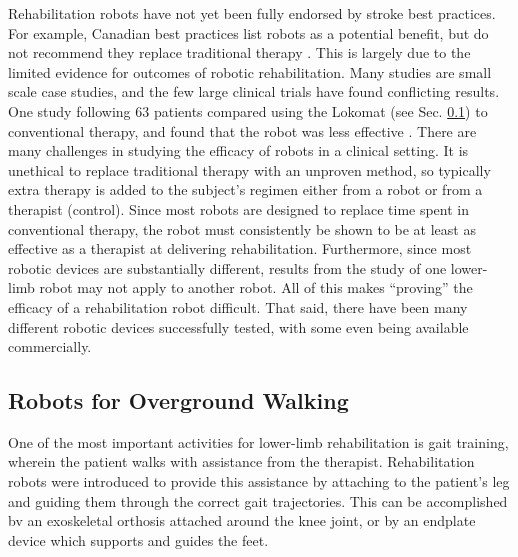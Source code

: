 \documentclass[12pt]{report}
\begin{document}
	
	Rehabilitation robots have not yet been fully endorsed by stroke best practices. For example, Canadian best practices list robots as a potential benefit, but do not recommend they replace traditional therapy \cite{Hebert2016}. This is largely due to the limited evidence for outcomes of robotic rehabilitation. Many studies are small scale case studies, and the 
few large clinical trials have found conflicting results. One study following 63 patients compared using the Lokomat (see Sec. \ref{Sec:Overground}) to conventional therapy, and found that the robot was less effective \cite{Hidler2008}. There are many challenges in studying the efficacy of robots in a clinical setting. It is unethical to replace traditional therapy with an unproven method, so typically extra therapy is added to the subject's regimen either from a robot or from a therapist (control). Since most robots are designed to replace time spent in conventional therapy, the robot must consistently be shown to be at least as effective as a therapist at delivering rehabilitation. Furthermore, since most robotic devices are substantially different, results from the study of one lower-limb robot may not apply to another robot. All of this makes ``proving'' the efficacy of a rehabilitation robot difficult. That said, there have been many different robotic devices successfully tested, with some even being available commercially. 
	
	
	\subsection{Robots for Overground Walking} \label{Sec:Overground}

	One of the most important activities for lower-limb rehabilitation is gait training, wherein the patient walks with assistance from the therapist. Rehabilitation robots were introduced to provide this assistance by attaching to the patient's leg and guiding them through the correct gait trajectories. This can be accomplished bv an exoskeletal orthosis attached around the knee joint, or by an endplate device which supports and guides the feet. 
	
	
	
	
\end{document}
